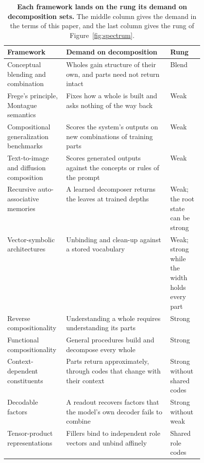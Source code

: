 \documentclass[10pt]{article}
\theoremstyle{plain}
\theoremstyle{remark}
\begin{document}
\begin{table}[t]
  \caption{\textbf{Each framework lands on the rung its demand on decomposition sets.} The middle column gives the demand in the terms of this paper, and the last column gives the rung of Figure~\ref{fig:spectrum}.}
  \label{tab:spectrum}
  \centering\small
  \begin{tabularx}{\linewidth}{@{}P{0.30\linewidth}YP{0.17\linewidth}@{}}
    \toprule
    Framework & Demand on decomposition & Rung \\
    \midrule
    Conceptual blending and combination \citep{fauconnier2002,osherson1981,kamp1995} & Wholes gain structure of their own, and parts need not return intact & Blend \\
    \addlinespace
    Frege's principle, Montague semantics \citep{frege1923,montague1970} & Fixes how a whole is built and asks nothing of the way back & Weak \\
    Compositional generalization benchmarks \citep{lake2018,keysers2020,hupkes2020,lake2023} & Scores the system's outputs on new combinations of training parts & Weak \\
    Text-to-image and diffusion composition \citep{ramesh2021,okawa2023,favero2025diffusion} & Scores generated outputs against the concepts or rules of the prompt & Weak \\
    Recursive auto-associative memories \citep{pollack1990} & A learned decomposer returns the leaves at trained depths & Weak; the root state can be strong \\
    Vector-symbolic architectures \citep{plate1995,gayler2006,kanerva2009} & Unbinding and clean-up against a stored vocabulary & Weak; strong while the width holds every part \\
    \addlinespace
    Reverse compositionality \citep{fodor2002} & Understanding a whole requires understanding its parts & Strong \\
    Functional compositionality \citep{vangelder1990} & General procedures build and decompose every whole & Strong \\
    Context-dependent constituents \citep{smolensky1988} & Parts return approximately, through codes that change with their context & Strong without shared codes \\
    Decodable factors \citep{montero2021} & A readout recovers factors that the model's own decoder fails to combine & Strong without weak \\
    \addlinespace
    Tensor-product representations \citep{smolensky1990} & Fillers bind to independent role vectors and unbind affinely & Shared role codes \\

\end{tabularx}
\end{table}
\end{document}
